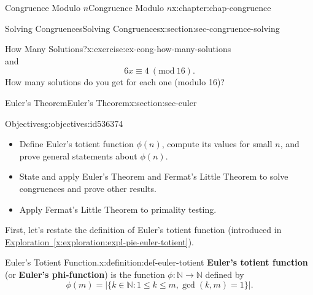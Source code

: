 \documentclass[oneside,10pt,]{book}
\newcommand{\xreffont}{\relax}
\newcommand{\terminology}[1]{\textbf{#1}}
\numberwithin{equation}{section}
\newlength{\qrsize}
\newlength{\previewwidth}
\newcommand{\Mod}[1]{\ \left(\mathrm{mod}\ #1\right)}
\begin{document}
\begin{chapterptx}{Congruence Modulo \(n\)}{}{Congruence Modulo \(n\)}{}{}{x:chapter:chap-congruence}
\begin{sectionptx}{Solving Congruences}{}{Solving Congruences}{}{}{x:section:sec-congruence-solving}
\begin{inlineexercise}{How Many Solutions?}{x:exercise:ex-cong-how-many-solutions}
\begin{equation*}
\end{equation*}
and%
\begin{equation*}
6x \equiv 4 \Mod{16}\text{.}
\end{equation*}
How many solutions do you get for each one (modulo 16)?%
\end{inlineexercise}%
\end{sectionptx}
%
%
\typeout{************************************************}
\typeout{************************************************}
%
\begin{sectionptx}{Euler's Theorem}{}{Euler's Theorem}{}{}{x:section:sec-euler}
\begin{objectives}{Objectives}{g:objectives:id536374}
%
\begin{itemize}[label=\textbullet]
\item{}Define Euler's totient function \(\phi(n)\), compute its values for small \(n\), and prove general statements about \(\phi(n)\).%
\item{}State and apply Euler's Theorem and Fermat's Little Theorem to solve congruences and prove other results.%
\item{}Apply Fermat's Little Theorem to primality testing.%
\end{itemize}
\end{objectives}
First, let's restate the definition of Euler's totient function (introduced in \hyperref[x:exploration:expl-pie-euler-totient]{Exploration~{\xreffont\ref{x:exploration:expl-pie-euler-totient}}}).%
\begin{definition}{Euler's Totient Function.}{x:definition:def-euler-totient}%
\terminology{Euler's totient function} (or \terminology{Euler's phi-function}) is the function \(\phi: \mathbb{N} \rightarrow \mathbb{N}\) defined by%
\begin{equation*}
\phi(m) = \bigl|\{k \in \mathbb{N} : 1 \leq k \leq m, \gcd(k,m) = 1\}\bigr|\text{.}
\end{equation*}
\label{g:notation:id536429}%
\end{definition}
\begin{sidebyside}{1}{0}{0}{0}%
\begin{sbspanel}{1}%
\setlength{\qrsize}{9em}
\setlength{\previewwidth}{\linewidth}
\addtolength{\previewwidth}{-\qrsize}
\begin{tcbraster}[raster columns=2, raster column skip=1pt, raster halign=center, raster force size=false, raster left skip=0pt, raster right skip=0pt]%
\begin{tcolorbox}[previewstyle, width=\previewwidth]%

\end{tcolorbox}
\end{tcbraster}
\end{sbspanel}
\end{sidebyside}
\end{sectionptx}
\end{chapterptx}
\end{document}
